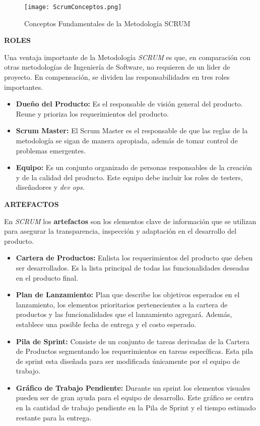 \begin{figure}[h!]
    \centering
    \texttt{[image: ScrumConceptos.png]}
    \caption{Conceptos Fundamentales de la Metodología SCRUM \parencite{sachdeva2016scrum}}
    \label{fig:ScrumConceptos}
\end{figure}

\textbf{ROLES}

Una ventaja importante de la Metodología \textit{SCRUM} es que, en comparación con otras metodologías de Ingeniería de Software, no requieren de un lider de proyecto. En compensación, se dividen las responsabilidades en tres roles importantes.

\begin{itemize}
    \item \textbf{Dueño del Producto: } Es el responsable de visión general del producto. Reune y prioriza los requerimientos del producto.
    \item \textbf{Scrum Master: } El Scrum Master es el responsable de que las reglas de la metodología se sigan de manera apropiada, además de tomar control de problemas emergentes.
    \item \textbf{Equipo:} Es un conjunto organizado de personas responsables de la creación y de la calidad del producto. Este equipo debe incluir los roles de testers, diseñadores y \textit{dev ops}.
\end{itemize}

\newpage

\textbf{ARTEFACTOS}

En \textit{SCRUM} los \textbf{artefactos} son los elementos clave de información que se utilizan para asegurar la transparencia, inspección y adaptación en el desarrollo del producto. 

\begin{itemize}
    \item \textbf{Cartera de Productos:} Enlista los requerimientos del producto que deben ser desarrollados. Es la lista principal de todas las funcionalidades deseadas en el producto final.
    \item \textbf{Plan de Lanzamiento: } Plan que describe los objetivos esperados en el lanzamiento, los elementos prioritarios pertenecientes a la cartera de productos y las funcionalidades que el lanzamiento agregará. Además, establece una posible fecha de entrega y el costo esperado.
    \item \textbf{Pila de Sprint: } Consiste de un conjunto de tareas derivadas de la Cartera de Productos segmentando los requerimientos en tareas específicas. Esta pila de sprint esta diseñada para ser modificada únicamente por el equipo de trabajo.
    \item \textbf{Gráfico de Trabajo Pendiente: } Durante un sprint los elementos visuales pueden ser de gran ayuda para el equipo de desarrollo. Este gráfico se centra en la cantidad de trabajo pendiente en la Pila de Sprint y el tiempo estimado restante para la entrega.
\end{itemize}

